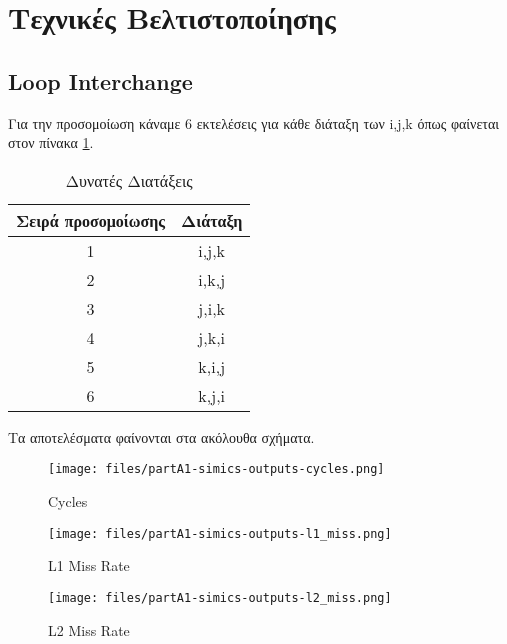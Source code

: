 \documentclass[a4paper,12pt]{article}
\begin{document}

\section*{Τεχνικές Βελτιστοποίησης}

\subsection{Loop Interchange}

Για την προσομοίωση κάναμε 6 εκτελέσεις για κάθε διάταξη των i,j,k όπως
φαίνεται στον πίνακα \ref{fig:T1}.

\begin{table}[H]
    \centering
    \begin{tabular}{| c | c |}
        \hline
        Σειρά προσομοίωσης & Διάταξη \\
        \hline
        \hline
        1   &  i,j,k \\
        \hline
        2   &  i,k,j \\
        \hline
        3   &  j,i,k \\
        \hline
        4   &  j,k,i \\
        \hline
        5   &  k,i,j \\
        \hline
        6   &  k,j,i \\
        \hline
    \end{tabular}
    \caption{Δυνατές Διατάξεις}
    \label{fig:T1}
\end{table}


Τα αποτελέσματα φαίνονται στα ακόλουθα σχήματα.

\begin{figure}[H]
	\centering
    \texttt{[image: files/partA1-simics-outputs-cycles.png]}
	\caption{Cycles}
	\label{fig:A1}
\end{figure}

\begin{figure}[H]
	\centering
    \texttt{[image: files/partA1-simics-outputs-l1\_miss.png]}
    \caption{L1 Miss Rate}
	\label{fig:A2}
\end{figure}

\begin{figure}[H]
	\centering
    \texttt{[image: files/partA1-simics-outputs-l2\_miss.png]}
    \caption{L2 Miss Rate}
	\label{fig:A3}
\end{figure}
\end{document}
